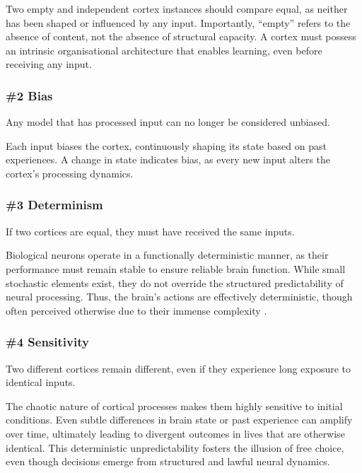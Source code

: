 \documentclass{article}
\newenvironment{one_assertion}[1]
{
  \begin{tabular}{p{1.5cm}p{8.2cm}}
    \textbf{Assertion:} & #1 \\
}{
  \end{tabular}\\
}
\begin{document}
Two empty and independent cortex instances should compare equal, as neither has been shaped or influenced by any input. Importantly, “empty” refers to the absence of content, not the absence of structural capacity. A cortex must possess an intrinsic organisational architecture that enables learning, even before receiving any input.


\subsubsection*{\#2 Bias}
\begin{one_assertion}
    {Any model that has processed input can no longer be considered unbiased.}
\end{one_assertion}

Each input biases the cortex, continuously shaping its state based on past experiences. A change in state indicates bias, as every new input alters the cortex's processing dynamics.

\subsubsection*{\#3 Determinism}
\begin{one_assertion}
    {If two cortices are equal, they must have received the same inputs.}
\end{one_assertion}

Biological neurons operate in a functionally deterministic manner, as their performance must remain stable to ensure reliable brain function. While small stochastic elements exist, they do not override the structured predictability of neural processing. Thus, the brain's actions are effectively deterministic, though often perceived otherwise due to their immense complexity \cite{AtlanticFreeWill}.

\subsubsection*{\#4 Sensitivity}
\begin{one_assertion}
    {Two different cortices remain different, even if they experience long exposure to identical inputs.}
\end{one_assertion}

The chaotic nature of cortical processes makes them highly sensitive to initial conditions. Even subtle differences in brain state or past experience can amplify over time, ultimately leading to divergent outcomes in lives that are otherwise identical. This deterministic unpredictability fosters the illusion of free choice, even though decisions emerge from structured and lawful neural dynamics.
\end{document}

